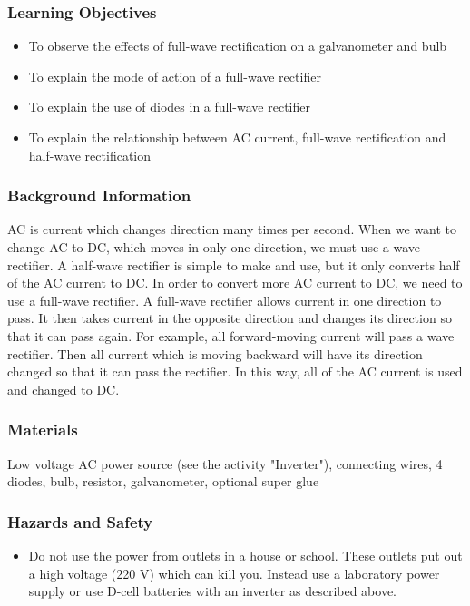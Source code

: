 \subsubsection*{Learning Objectives}
\begin{itemize}
\item{To observe the effects of full-wave rectification on a galvanometer and bulb}
\item{To explain the mode of action of a full-wave rectifier}
\item{To explain the use of diodes in a full-wave rectifier}
\item{To explain the relationship between AC current, full-wave rectification and half-wave rectification}
\end{itemize}

\subsubsection*{Background Information}
AC is current which changes direction many times per second.  When we want to change AC to DC, which moves in only one direction, we must use a wave-rectifier.  A half-wave rectifier is simple to make and use, but it only converts half of the AC current to DC.  In order to convert more AC current to DC, we need to use a full-wave rectifier.
A full-wave rectifier allows current in one direction to pass.  It then takes current in the opposite direction and changes its direction so that it can pass again.  For example, all forward-moving current will pass a wave rectifier.  Then all current which is moving backward will have its direction changed so that it can pass the rectifier.  In this way, all of the AC current is used and changed to DC.

\subsubsection*{Materials}
Low voltage AC power source (see the activity "Inverter"), connecting wires, 4 diodes, bulb, resistor, galvanometer, optional super glue

\subsubsection*{Hazards and Safety}
\begin{itemize}
\item{Do not use the power from outlets in a house or school.  These outlets put out a high voltage (220 V) which can kill you.  Instead use a laboratory power supply or use D-cell batteries with an inverter as described above.}
\end{itemize}

